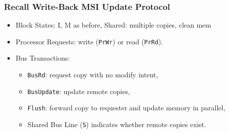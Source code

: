 \documentclass{beamer}
\newcommand{\emp}[1]{\textcolor{DikuRed}{ #1}}
\begin{document}
\begin{frame}[fragile,t]
\frametitle{Recall Write-Back MSI Update Protocol}

\begin{itemize}
    \item \emp{Block States}: I, M as before, Shared: multiple copies, clean mem

    \item \emp{Processor Requests}: write ({\tt PrWr}) or read ({\tt PrRd}).\smallskip

    \item \emp{Bus Transactions}:
        \begin{itemize}
            \item {\tt BusRd}: request copy with no modify intent,
            \item {\tt BusUpdate}: update remote copies,
            \item {\tt Flush}: forward copy to requester and update memory in parallel,
            \item \emp{Shared Bus Line ({\tt S}) indicates whether remote copies exist.}
        \end  {itemize}
\end{itemize}
\vspace{-3ex}


\end{frame}
\end{document}
